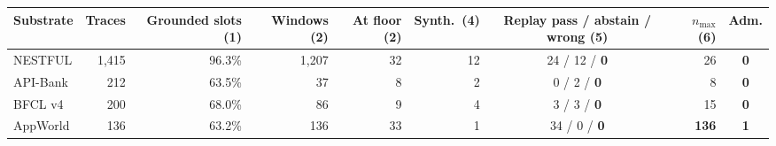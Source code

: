 \begin{tabular}{@{}lrrrrrcrc@{}}
\toprule
Substrate & Traces & Grounded slots (1) & Windows (2) & At floor (2) & Synth.\ (4) & Replay pass / abstain / \textbf{wrong} (5) & $n_{\max}$ (6) & Adm. \\
\midrule
NESTFUL   & 1{,}415 & 96.3\% & 1{,}207 & 32 & 12 & 24 / 12 / \textbf{0} & 26 & \textbf{0} \\
API-Bank  &     212 & 63.5\% &      37 &  8 &  2 &  0 /  2 / \textbf{0} &  8 & \textbf{0} \\
BFCL v4   &     200 & 68.0\% &      86 &  9 &  4 &  3 /  3 / \textbf{0} & 15 & \textbf{0} \\
AppWorld  &     136 & 63.2\% &     136 & 33 &  1 & 34 /  0 / \textbf{0} & \textbf{136} & \textbf{1} \\
\bottomrule
\end{tabular}
